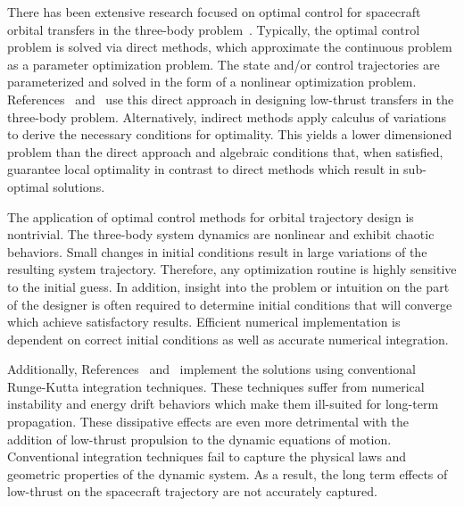 There has been extensive research focused on optimal control for spacecraft orbital transfers in the three-body problem~\cite{mingotti2011,grebow2011}.
Typically, the optimal control problem is solved via direct methods, which approximate the continuous problem as a parameter optimization problem.
The state and/or control trajectories are parameterized and solved in the form of a nonlinear optimization problem.
References~\cite{mingotti2011} and~\cite{grebow2011} use this direct approach in designing low-thrust transfers in the three-body problem.
Alternatively, indirect methods apply calculus of variations to derive the necessary conditions for optimality. 
This yields a lower dimensioned problem than the direct approach and algebraic conditions that, when satisfied, guarantee local optimality in contrast to direct methods which result in sub-optimal solutions.

The application of optimal control methods for orbital trajectory design is nontrivial.
The three-body system dynamics are nonlinear and exhibit chaotic behaviors. 
Small changes in initial conditions result in large variations of the resulting system trajectory. 
Therefore, any optimization routine is highly sensitive to the initial guess.
In addition, insight into the problem or intuition on the part of the designer is often required to determine initial conditions that will converge which achieve satisfactory results.
Efficient numerical implementation is dependent on correct initial conditions as well as accurate numerical integration.

Additionally, References~\cite{mingotti2011} and~\cite{grebow2011} implement the solutions using conventional Runge-Kutta integration techniques.
These techniques suffer from numerical instability and energy drift behaviors which make them ill-suited for long-term propagation.
These dissipative effects are even more detrimental with the addition of low-thrust propulsion to the dynamic equations of motion.
Conventional integration techniques fail to capture the physical laws and geometric properties of the dynamic system.
As a result, the long term effects of low-thrust on the spacecraft trajectory are not accurately captured. 

